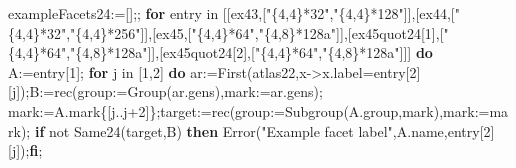 \documentclass[
  10pt,
  letterpaper,
]{article}
\newenvironment{Shaded}{}{}
\newcommand{\BuiltInTok}[1]{\textcolor[rgb]{0.00,0.50,0.00}{#1}}
\newcommand{\ConstantTok}[1]{\textcolor[rgb]{0.53,0.00,0.00}{#1}}
\newcommand{\ControlFlowTok}[1]{\textcolor[rgb]{0.00,0.44,0.13}{\textbf{#1}}}
\newcommand{\ExtensionTok}[1]{#1}
\newcommand{\FloatTok}[1]{\textcolor[rgb]{0.25,0.63,0.44}{#1}}
\newcommand{\NormalTok}[1]{#1}
\newcommand{\OperatorTok}[1]{\textcolor[rgb]{0.40,0.40,0.40}{#1}}
\newcommand{\StringTok}[1]{\textcolor[rgb]{0.25,0.44,0.63}{#1}}
\newcommand{\VariableTok}[1]{\textcolor[rgb]{0.10,0.09,0.49}{#1}}
\begin{document}
\begin{Shaded}
\begin{Highlighting}[]
\VariableTok{exampleFacets24}\OperatorTok{:=}\NormalTok{[]}\OperatorTok{;;}
\ControlFlowTok{for} \VariableTok{entry} \ExtensionTok{in}\NormalTok{ [[}\VariableTok{ex43}\OperatorTok{,}\NormalTok{[}\StringTok{"\{4,4\}*32"}\OperatorTok{,}\StringTok{"\{4,4\}*128"}\NormalTok{]]}\OperatorTok{,}\NormalTok{[}\VariableTok{ex44}\OperatorTok{,}\NormalTok{[}\StringTok{"\{4,4\}*32"}\OperatorTok{,}\StringTok{"\{4,4\}*256"}\NormalTok{]]}\OperatorTok{,}\NormalTok{[}\VariableTok{ex45}\OperatorTok{,}\NormalTok{[}\StringTok{"\{4,4\}*64"}\OperatorTok{,}\StringTok{"\{4,8\}*128a"}\NormalTok{]]}\OperatorTok{,}\NormalTok{[}\VariableTok{ex45quot24}\NormalTok{[}\FloatTok{1}\NormalTok{]}\OperatorTok{,}\NormalTok{[}\StringTok{"\{4,4\}*64"}\OperatorTok{,}\StringTok{"\{4,8\}*128a"}\NormalTok{]]}\OperatorTok{,}\NormalTok{[}\VariableTok{ex45quot24}\NormalTok{[}\FloatTok{2}\NormalTok{]}\OperatorTok{,}\NormalTok{[}\StringTok{"\{4,4\}*64"}\OperatorTok{,}\StringTok{"\{4,8\}*128a"}\NormalTok{]]] }\ControlFlowTok{do}
 \VariableTok{A}\OperatorTok{:=}\VariableTok{entry}\NormalTok{[}\FloatTok{1}\NormalTok{]}\OperatorTok{;}
 \ControlFlowTok{for} \VariableTok{j} \ExtensionTok{in}\NormalTok{ [}\FloatTok{1}\OperatorTok{,}\FloatTok{2}\NormalTok{] }\ControlFlowTok{do}
  \VariableTok{ar}\OperatorTok{:=}\BuiltInTok{First}\NormalTok{(}\VariableTok{atlas22}\OperatorTok{,}\VariableTok{x}\OperatorTok{{-}\textgreater{}}\VariableTok{x}\NormalTok{.}\VariableTok{label}\OperatorTok{=}\VariableTok{entry}\NormalTok{[}\FloatTok{2}\NormalTok{][}\VariableTok{j}\NormalTok{])}\OperatorTok{;}\VariableTok{B}\OperatorTok{:=}\ExtensionTok{rec}\NormalTok{(}\VariableTok{group}\OperatorTok{:=}\BuiltInTok{Group}\NormalTok{(}\VariableTok{ar}\NormalTok{.}\VariableTok{gens}\NormalTok{)}\OperatorTok{,}\VariableTok{mark}\OperatorTok{:=}\VariableTok{ar}\NormalTok{.}\VariableTok{gens}\NormalTok{)}\OperatorTok{;}
  \VariableTok{mark}\OperatorTok{:=}\VariableTok{A}\NormalTok{.}\VariableTok{mark}\NormalTok{\{[}\VariableTok{j}\OperatorTok{..}\VariableTok{j}\OperatorTok{+}\FloatTok{2}\NormalTok{]\}}\OperatorTok{;}\VariableTok{target}\OperatorTok{:=}\ExtensionTok{rec}\NormalTok{(}\VariableTok{group}\OperatorTok{:=}\BuiltInTok{Subgroup}\NormalTok{(}\VariableTok{A}\NormalTok{.}\VariableTok{group}\OperatorTok{,}\VariableTok{mark}\NormalTok{)}\OperatorTok{,}\VariableTok{mark}\OperatorTok{:=}\VariableTok{mark}\NormalTok{)}\OperatorTok{;}
  \ControlFlowTok{if} \ConstantTok{not} \VariableTok{Same24}\NormalTok{(}\VariableTok{target}\OperatorTok{,}\VariableTok{B}\NormalTok{) }\ControlFlowTok{then} \BuiltInTok{Error}\NormalTok{(}\StringTok{"Example facet label"}\OperatorTok{,}\VariableTok{A}\NormalTok{.}\VariableTok{name}\OperatorTok{,}\VariableTok{entry}\NormalTok{[}\FloatTok{2}\NormalTok{][}\VariableTok{j}\NormalTok{])}\OperatorTok{;}\ControlFlowTok{fi}\OperatorTok{;}

\end{Highlighting}
\end{Shaded}
\end{document}
